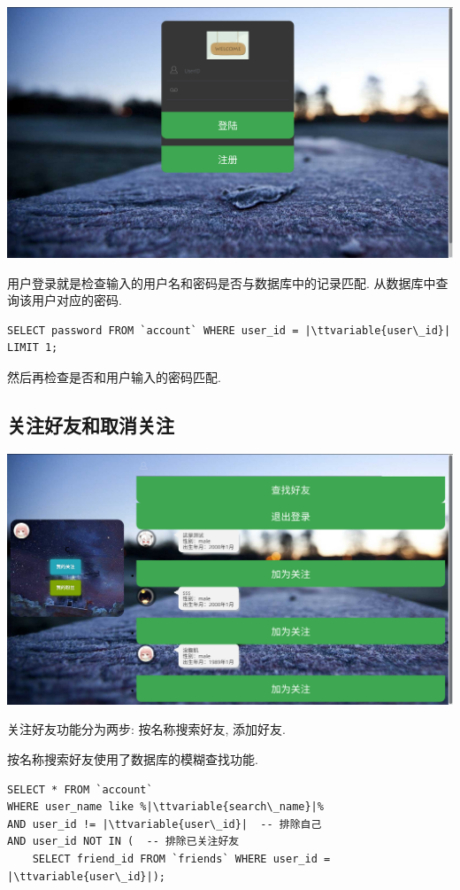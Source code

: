\documentclass[a4paper,10pt]{article}
\newcommand{\ttvariable}[1]{\texttt{\textit{#1}}}
\begin{document}
\begin{center}
	\includegraphics[scale=0.25]{login.png}
\end{center}

用户登录就是检查输入的用户名和密码是否与数据库中的记录匹配. 从数据库中查询该用户对应的密码.
\begin{verbatim}
SELECT password FROM `account` WHERE user_id = |\ttvariable{user\_id}| LIMIT 1;
\end{verbatim}
然后再检查是否和用户输入的密码匹配.

\subsection{关注好友和取消关注}

\begin{center}
	\includegraphics[scale=0.25]{search.png}
\end{center}

关注好友功能分为两步: 按名称搜索好友, 添加好友.

按名称搜索好友使用了数据库的模糊查找功能.
\begin{verbatim}
SELECT * FROM `account`
WHERE user_name like %|\ttvariable{search\_name}|%
AND user_id != |\ttvariable{user\_id}|  -- 排除自己
AND user_id NOT IN (  -- 排除已关注好友
    SELECT friend_id FROM `friends` WHERE user_id = |\ttvariable{user\_id}|);
\end{verbatim}
\end{document}
